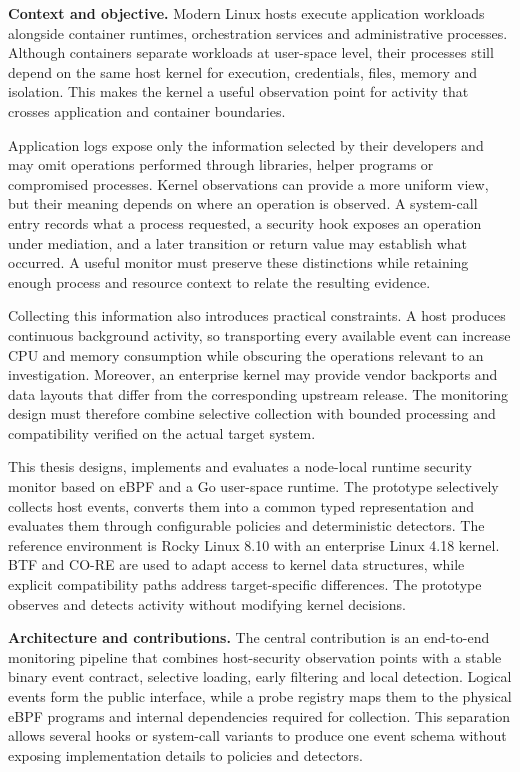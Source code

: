 \noindent\textbf{Context and objective.}
Modern Linux hosts execute application workloads alongside container runtimes,
orchestration services and administrative processes. Although containers
separate workloads at user-space level, their processes still depend on the
same host kernel for execution, credentials, files, memory and isolation. This
makes the kernel a useful observation point for activity that crosses
application and container boundaries.

Application logs expose only the information selected by their developers and
may omit operations performed through libraries, helper programs or compromised
processes. Kernel observations can provide a more uniform view, but their
meaning depends on where an operation is observed. A system-call entry records
what a process requested, a security hook exposes an operation under mediation,
and a later transition or return value may establish what occurred. A useful
monitor must preserve these distinctions while retaining enough process and
resource context to relate the resulting evidence.

Collecting this information also introduces practical constraints. A host
produces continuous background activity, so transporting every available event
can increase CPU and memory consumption while obscuring the operations relevant
to an investigation. Moreover, an enterprise kernel may provide vendor
backports and data layouts that differ from the corresponding upstream release.
The monitoring design must therefore combine selective collection with bounded
processing and compatibility verified on the actual target system.

This thesis designs, implements and evaluates a node-local runtime security
monitor based on eBPF and a Go user-space runtime. The prototype selectively
collects host events, converts them into a common typed representation and
evaluates them through configurable policies and deterministic detectors. The
reference environment is Rocky Linux 8.10 with an enterprise Linux 4.18
kernel. BTF and CO-RE are used to adapt access to kernel data structures, while
explicit compatibility paths address target-specific differences. The
prototype observes and detects activity without modifying kernel decisions.

\medskip
\noindent\textbf{Architecture and contributions.}
The central contribution is an end-to-end monitoring pipeline that combines
host-security observation points with a stable binary event contract,
selective loading, early filtering and local detection. Logical events form the
public interface, while a probe registry maps them to the physical eBPF
programs and internal dependencies required for collection. This separation
allows several hooks or system-call variants to produce one event schema
without exposing implementation details to policies and detectors.

